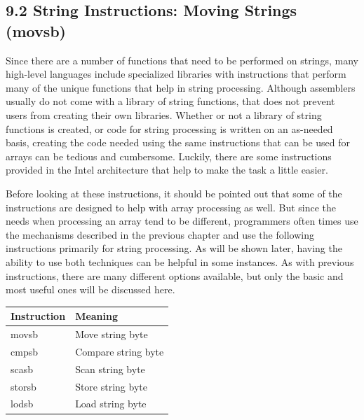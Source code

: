 \documentclass[10pt]{book}
\begin{document}
\begin{center}
\begin{center}
\begin{center}
\subsection*{9.2 String Instructions: Moving Strings (movsb)}
Since there are a number of functions that need to be performed on strings, many high-level languages include specialized libraries with instructions that perform many of the unique functions that help in string processing. Although assemblers usually do not come with a library of string functions, that does not prevent users from creating their own libraries. Whether or not a library of string functions is created, or code for string processing is written on an as-needed basis, creating the code needed using the same instructions that can be used for arrays can be tedious and cumbersome. Luckily, there are some instructions provided in the Intel architecture that help to make the task a little easier.

Before looking at these instructions, it should be pointed out that some of the instructions are designed to help with array processing as well. But since the needs when processing an array tend to be different, programmers often times use the mechanisms described in the previous chapter and use the following instructions primarily for string processing. As will be shown later, having the ability to use both techniques can be helpful in some instances. As with previous instructions, there are many different options available, but only the basic and most useful ones will be discussed here.

\begin{center}
\begin{tabular}{|l|l|}
\hline
Instruction & Meaning \\
\hline
movsb & Move string byte \\
\hline
cmpsb & Compare string byte \\
\hline
scasb & Scan string byte \\
\hline
storsb & Store string byte \\
\hline
lodsb & Load string byte \\
\hline
\end{tabular}
\end{center}


\end{center}
\end{center}
\end{center}
\end{document}
